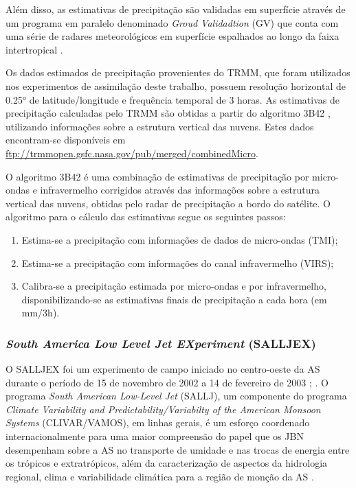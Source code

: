 Além disso, as estimativas de precipitação são validadas em superfície através de um programa em paralelo denominado \textit{Groud Validadtion} (GV) que conta com uma série de radares meteorológicos em superfície espalhados ao longo da faixa intertropical \cite{collischonnetal07}.

Os dados estimados de precipitação provenientes do TRMM, que foram utilizados nos experimentos de assimilação deste trabalho, possuem resolução horizontal de 0.25° de latitude/longitude e frequência temporal de 3 horas. As estimativas de precipitação calculadas pelo TRMM são obtidas a partir do algoritmo 3B42 \cite{huffmanetal07}, utilizando informações sobre a estrutura vertical das nuvens. Estes dados encontram-se disponíveis em \url{ftp://trmmopen.gsfc.nasa.gov/pub/merged/combinedMicro}.
    
O algoritmo 3B42 é uma combinação de estimativas de precipitação por micro-ondas e infravermelho corrigidos através das informações sobre a estrutura vertical das nuvens, obtidas pelo radar de precipitação a bordo do satélite. O algoritmo para o cálculo das estimativas segue os seguintes passos:

\begin{enumerate}
\item Estima-se a precipitação com informações de dados de micro-ondas (TMI);
\item Estima-se a precipitação com informações do canal infravermelho (VIRS);
\item Calibra-se a precipitação estimada por micro-ondas e por infravermelho, disponibilizando-se as estimativas finais de precipitação a cada hora (em mm/3h).
\end{enumerate}

\subsubsection{\textit{South America Low Level Jet EXperiment} (SALLJEX)}

O SALLJEX foi um experimento de campo iniciado no centro-oeste da AS durante o período de 15 de novembro de 2002 a 14 de fevereiro de 2003 \cite{vera06}; \cite{herdiesetal07}. O programa \textit{South American Low-Level Jet} (SALLJ), um componente do programa \textit{Climate Variability and Predictability/Variabilty of the American Monsoon Systems} (CLIVAR/VAMOS), em linhas gerais, é um esforço coordenado internacionalmente para uma maior compreensão do papel que os JBN desempenham sobre a AS no transporte de umidade e nas trocas de energia entre os trópicos e extratrópicos, além da caracterização de aspectos da hidrologia regional, clima e variabilidade climática para a região de monção da AS \cite{herdiesetal07}.

